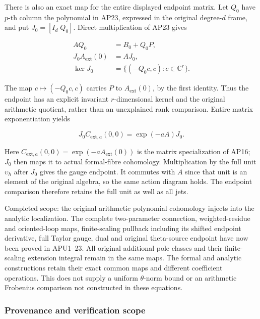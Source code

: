 There is also an exact map for the entire displayed endpoint matrix. Let \(Q_0\) have \(p\)-th column the polynomial in AP23, expressed in the original degree-\(d\) frame, and put \(J_0=[I_d\;Q_0]\). Direct multiplication of AP23 gives

\[
\begin{aligned}
A Q_0&=B_0+Q_0 P,\\
J_0 A_{\mathrm{ext}}(0)&=A J_0,\\
\ker J_0&=\{(-Q_0 c,c):c\in\mathbb C^r\}.
\end{aligned}
\tag{AP25}
\]

The map \(c\mapsto(-Q_0 c,c)\) carries \(P\) to \(A_{\mathrm{ext}}(0)\), by the first identity. Thus the endpoint has an explicit invariant \(r\)-dimensional kernel and the original arithmetic quotient, rather than an unexplained rank comparison. Entire matrix exponentiation yields

\[
J_0 C_{\mathrm{ext},a}(0,0)=\exp(-aA)J_0.
\tag{AP26}
\]

Here \(C_{\mathrm{ext},a}(0,0)=\exp(-a A_{\mathrm{ext}}(0))\) is the matrix specialization of AP16; \(J_0\) then maps it to actual formal-fibre cohomology. Multiplication by the full unit \(\upsilon_h\) after \(J_0\) gives the gauge endpoint. It commutes with \(A\) since that unit is an element of the original algebra, so the same action diagram holds. The endpoint comparison therefore retains the full unit as well as all jets.

Completed scope: the original arithmetic polynomial cohomology injects into the analytic localization. The complete two-parameter connection, weighted-residue and oriented-loop maps, finite-scaling pullback including its shifted endpoint derivative, full Taylor gauge, dual and original theta-source endpoint have now been proved in APU1--23. All original additional pole classes and their finite-scaling extension integral remain in the same maps. The formal and analytic constructions retain their exact common maps and different coefficient operations. This does not supply a uniform \(\theta\)-norm bound or an arithmetic Frobenius comparison not constructed in these equations.

\subsubsection{Provenance and verification scope}\label{endpoint-analytic_pole--provenance-and-verification-scope}

